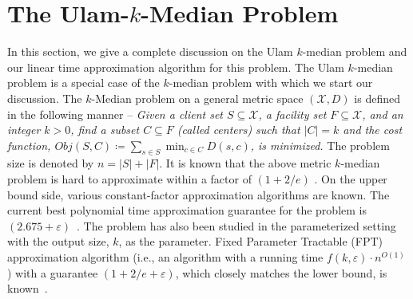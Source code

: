 \documentclass[11pt]{llncs}
\newcommand{\X}{\mathcal{X}}
\newcommand{\veps}{\varepsilon}
\begin{document}
\appendix



























\section{The Ulam-$k$-Median Problem}
\label{sec:ulamdetails}
In this section, we give a complete discussion on the Ulam $k$-median problem and our linear time approximation algorithm for this problem. 
The Ulam $k$-median problem is a special case of the $k$-median problem with which we start our discussion.
The $k$-Median problem on a general metric space $(\X, D)$ is defined in the following manner -- {\it Given a client set $S \subseteq \X$, a facility set $F \subseteq \X$, and an integer $k>0$, find a subset $C \subseteq F$ (called centers) such that $|C| = k$ and the cost function, $Obj(S, C) \coloneq \sum_{s \in S} \min_{c \in C} D(s, c)$, is minimized.} The problem size is denoted by $n = |S| + |F|$. It is known that the above metric $k$-median problem is hard to approximate within a factor of $(1+2/e)$ \cite{gk99}. On the upper bound side, various constant-factor approximation algorithms are known. The current best polynomial time approximation guarantee for the problem is $(2.675+\varepsilon)$~\cite{byrka17}. The problem has also been studied in the parameterized setting with the output size, $k$, as the parameter. Fixed Parameter Tractable (FPT) approximation algorithm (i.e., an algorithm with a running time $f(k, \veps) \cdot n^{O(1)}$) with a guarantee $(1+2/e + \veps)$, which closely matches the lower bound, is known~\cite{cgkll19}. 
\end{document}
